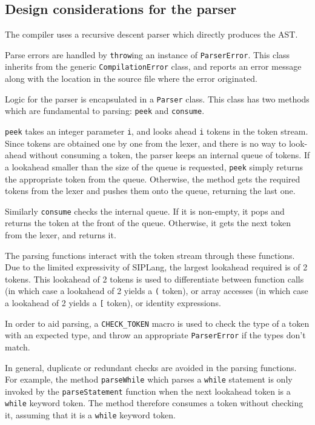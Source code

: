 \documentclass[11pt,a4paper]{scrartcl}
\begin{document}
\subsection{Design considerations for the parser}

The compiler uses a recursive descent parser which directly produces the AST.

Parse errors are handled by \verb!throw!ing an instance of \verb!ParserError!. This class inherits from the generic \verb!CompilationError! class, and reports an error message along with the location in the source file where the error originated.

Logic for the parser is encapsulated in a \verb!Parser! class. This class has two methods which are fundamental to parsing: \verb!peek! and \verb!consume!.

\verb!peek! takes an integer parameter \verb!i!, and looks ahead \verb!i! tokens in the token stream. Since tokens are obtained one by one from the lexer, and there is no way to look-ahead without consuming a token, the parser keeps an internal queue of tokens. If a lookahead smaller than the size of the queue is requested, \verb!peek! simply returns the appropriate token from the queue. Otherwise, the method gets the required tokens from the lexer and pushes them onto the queue, returning the last one.

Similarly \verb!consume! checks the internal queue. If it is non-empty, it pops and returns the token at the front of the queue. Otherwise, it gets the next token from the lexer, and returns it.

The parsing functions interact with the token stream through these functions. Due to the limited expressivity of SIPLang, the largest lookahead required is of 2 tokens. This lookahead of 2 tokens is used to differentiate between function calls (in which case a lookahead of 2 yields a \verb!(! token), or array accesses (in which case a lookahead of 2 yields a \verb![! token), or identity expressions.

In order to aid parsing, a \verb!CHECK_TOKEN! macro is used to check the type of a token with an expected type, and throw an appropriate \verb!ParserError! if the types don't match.

In general, duplicate or redundant checks are avoided in the parsing functions. For example, the method \verb!parseWhile! which parses a \verb!while! statement is only invoked by the \verb!parseStatement! function when the next lookahead token is a \verb!while! keyword token. The method therefore consumes a token without checking it, assuming that it is a \verb!while! keyword token.
\end{document}
